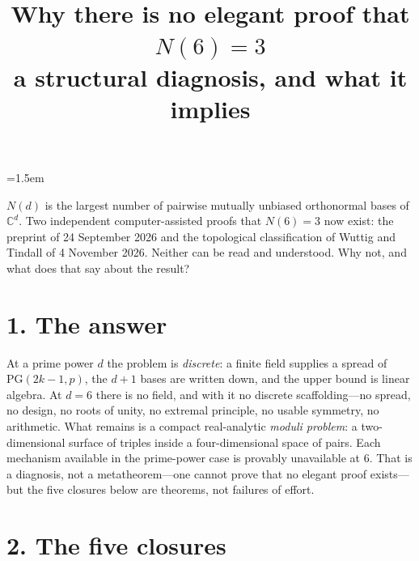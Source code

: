 \documentclass[10pt]{article}
\title{Why there is no elegant proof that $N(6)=3$\\[2pt]
\large a structural diagnosis, and what it implies}
\author{}
\date{}
\begin{document}
\maketitle
\emergencystretch=1.5em
\vspace{-1.4em}

\noindent
$N(d)$ is the largest number of pairwise mutually unbiased orthonormal bases of $\mathbb{C}^d$. Two
independent computer-assisted proofs that $N(6)=3$ now exist: the preprint of 24 September 2026 and the
topological classification of Wuttig and Tindall of 4 November 2026. Neither can be read and understood.
Why not, and what does that say about the result?

\section*{1. The answer}

At a prime power $d$ the problem is \emph{discrete}: a finite field supplies a spread of
$\mathrm{PG}(2k-1,p)$, the $d+1$ bases are written down, and the upper bound is linear algebra. At $d=6$
there is no field, and with it no discrete scaffolding---no spread, no design, no roots of unity, no
extremal principle, no usable symmetry, no arithmetic. What remains is a compact real-analytic
\emph{moduli problem}: a two-dimensional surface of triples inside a four-dimensional space of pairs.
Each mechanism available in the prime-power case is provably unavailable at $6$. That is a diagnosis,
not a metatheorem---one cannot prove that no elegant proof exists---but the five closures below are
theorems, not failures of effort.

\section*{2. The five closures}
\end{document}
